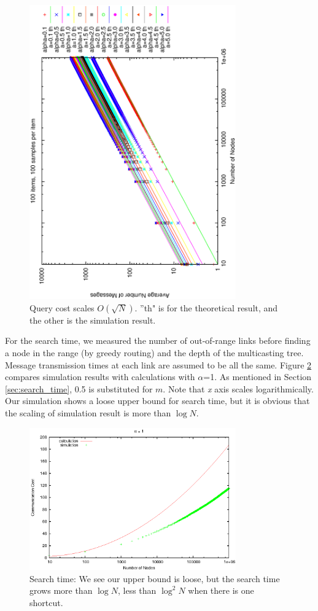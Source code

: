 \documentclass[9.5pt,journal,final,finalsubmission,twocolumn]{IEEEtran}
\begin{document}
\begin{figure}
\centering
\includegraphics[angle=270,width=3.5in]{th_hops_loglog}
\caption{Query cost scales $O(\sqrt N)$. ''th" is for the theoretical result, 
and the other is the simulation result.} \label{fig:cost}
\end{figure}

For the search time, we measured the number of out-of-range links before finding 
a node in the range (by greedy routing) and the depth of the multicasting tree. Message 
transmission times at each link are assumed to be all the same. Figure \ref{fig:time} %
compares simulation results with calculations with $\alpha$=1. 
As mentioned in Section \ref{sec:search_time}, 0.5 is substituted for $m$. 
Note that \textit{x} axis scales logarithmically. Our simulation shows a loose upper bound for search time, 
but it is obvious that the scaling of simulation result is more than 
$\log N$.
\begin{figure}
\centering
\includegraphics[width=3.5in]{time1}
\caption{Search time: We see our upper bound is loose, but the search time grows 
more than $\log N$, less than $\log^2 N$ when there is one shortcut.} \label{fig:time}
\end{figure}
\end{document}
